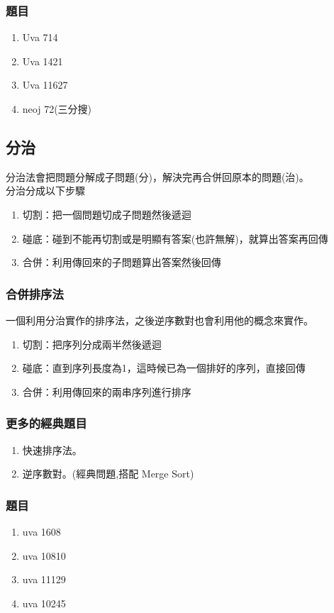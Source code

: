 \subsubsection{題目}
\begin{enumerate}
\item Uva 714
\item Uva 1421
\item Uva 11627
\item neoj 72(三分搜)
\end{enumerate}
\subsection{分治}
分治法會把問題分解成子問題(分)，解決完再合併回原本的問題(治)。\\
分治分成以下步驟
\begin{enumerate}
\item 切割：把一個問題切成子問題然後遞迴
\item 碰底：碰到不能再切割或是明顯有答案(也許無解)，就算出答案再回傳
\item 合併：利用傳回來的子問題算出答案然後回傳
\end{enumerate}
\subsubsection{合併排序法}
一個利用分治實作的排序法，之後逆序數對也會利用他的概念來實作。
\begin{enumerate}
\item 切割：把序列分成兩半然後遞迴
\item 碰底：直到序列長度為1，這時候已為一個排好的序列，直接回傳
\item 合併：利用傳回來的兩串序列進行排序
\end{enumerate}
\subsubsection{更多的經典題目}
\begin{enumerate}
\item 快速排序法。
\item 逆序數對。(經典問題,搭配 Merge Sort)
\end{enumerate}
\subsubsection{題目}
\begin{enumerate}
\item uva 1608
\item uva 10810
\item uva 11129
\item uva 10245
\end{enumerate}
